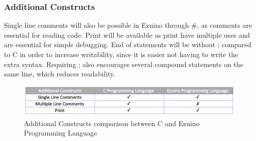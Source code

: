 \subsubsection*{Additional Constructs}
Single line comments will also be possible in Ezuino through \#, as comments are essential for reading code. Print will be available as print have multiple uses and are essential for simple debugging. End of statements will be without ; compared to C in order to increase writability, since it is easier not having to write the extra syntax. Requiring ; also encourages several compound statements on the same line, which reduces readability. 
\begin{figure}[H]
\centering
\includegraphics[scale=0.60]{figures/language_features/langf09.png}
\caption{Additional Constructs comparison between C and Ezuino Programming Language}
\label{lf09}
\end{figure}